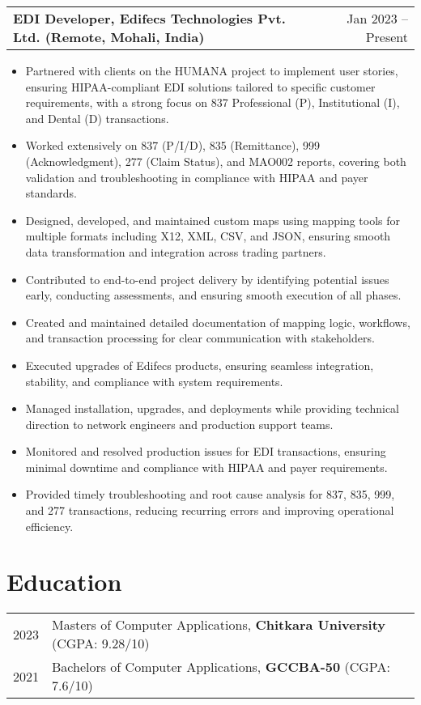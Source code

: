 \documentclass[a4paper,11pt]{article}
\makeatletter
\newenvironment{joblong}[2]
    {
    \begin{tabularx}{\linewidth}{@{}l X r@{}}
    \textbf{#1} & \hfill &  #2 \\[3pt]
    \end{tabularx}
    \begin{minipage}[t]{\linewidth}
    \begin{itemize}[nosep,after=\strut, leftmargin=1em, itemsep=2pt,label=--]
    }
    {
    \end{itemize}
    \end{minipage}    
    }
\makeatother
\begin{document}
\begin{joblong}{EDI Developer, Edifecs Technologies Pvt. Ltd. (Remote, Mohali, India)}{Jan 2023 -- Present}
    \item Partnered with clients on the HUMANA project to implement user stories, ensuring HIPAA-compliant EDI solutions tailored to specific customer requirements, with a strong focus on 837 Professional (P), Institutional (I), and Dental (D) transactions.
    \item Worked extensively on 837 (P/I/D), 835 (Remittance), 999 (Acknowledgment), 277 (Claim Status), and MAO002 reports, covering both validation and troubleshooting in compliance with HIPAA and payer standards.
    \item Designed, developed, and maintained custom maps using mapping tools for multiple formats including X12, XML, CSV, and JSON, ensuring smooth data transformation and integration across trading partners.
    \item Contributed to end-to-end project delivery by identifying potential issues early, conducting assessments, and ensuring smooth execution of all phases.
    \item Created and maintained detailed documentation of mapping logic, workflows, and transaction processing for clear communication with stakeholders.
    \item Executed upgrades of Edifecs products, ensuring seamless integration, stability, and compliance with system requirements.
    \item Managed installation, upgrades, and deployments while providing technical direction to network engineers and production support teams.
    \item Monitored and resolved production issues for EDI transactions, ensuring minimal downtime and compliance with HIPAA and payer requirements.
    \item Provided timely troubleshooting and root cause analysis for 837, 835, 999, and 277 transactions, reducing recurring errors and improving operational efficiency.
\end{joblong}

\section{Education}
\begin{tabularx}{\linewidth}{@{}l X@{}} 	
2023 & Masters of Computer Applications, \textbf{Chitkara University} \hfill (CGPA: 9.28/10) \\
2021 & Bachelors of Computer Applications, \textbf{GCCBA-50} \hfill (CGPA: 7.6/10) \\
\end{tabularx}
\end{document}
